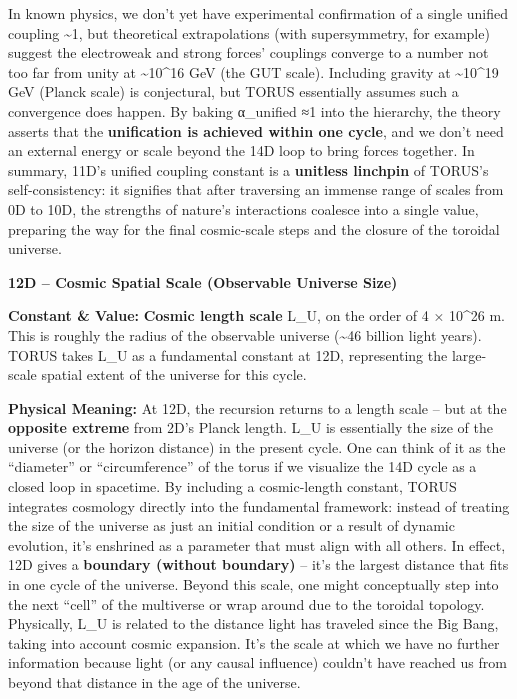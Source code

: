 \documentclass[
]{article}
\begin{document}
In known physics, we don't yet have experimental confirmation of a
single unified coupling \textasciitilde1, but theoretical extrapolations
(with supersymmetry, for example) suggest the electroweak and strong
forces' couplings converge to a number not too far from unity at
\textasciitilde10\^{}16 GeV (the GUT scale)\hspace{0pt}. Including
gravity at \textasciitilde10\^{}19 GeV (Planck scale) is conjectural,
but TORUS essentially assumes such a convergence does happen. By baking
α\_unified ≈1 into the hierarchy, the theory asserts that the
\textbf{unification is achieved within one cycle}, and we don't need an
external energy or scale beyond the 14D loop to bring forces together.
In summary, 11D's unified coupling constant is a \textbf{unitless
linchpin} of TORUS's self-consistency: it signifies that after
traversing an immense range of scales from 0D to 10D, the strengths of
nature's interactions coalesce into a single value, preparing the way
for the final cosmic-scale steps and the closure of the toroidal
universe.

\textbf{12D -- Cosmic Spatial Scale (Observable Universe Size)}

\textbf{Constant \& Value:} \textbf{Cosmic length scale} L\_U, on the
order of 4 × 10\^{}26 m\hspace{0pt}. This is roughly the radius of the
observable universe (\textasciitilde46 billion light years). TORUS takes
L\_U as a fundamental constant at 12D, representing the large-scale
spatial extent of the universe for this cycle.

\textbf{Physical Meaning:} At 12D, the recursion returns to a length
scale -- but at the \textbf{opposite extreme} from 2D's Planck length.
L\_U is essentially the size of the universe (or the horizon distance)
in the present cycle\hspace{0pt}. One can think of it as the
``diameter'' or ``circumference'' of the torus if we visualize the 14D
cycle as a closed loop in spacetime\hspace{0pt}. By including a
cosmic-length constant, TORUS integrates cosmology directly into the
fundamental framework: instead of treating the size of the universe as
just an initial condition or a result of dynamic evolution, it's
enshrined as a parameter that must align with all others. In effect, 12D
gives a \textbf{boundary (without boundary)} -- it's the largest
distance that fits in one cycle of the universe. Beyond this scale, one
might conceptually step into the next ``cell'' of the multiverse or wrap
around due to the toroidal topology. Physically, L\_U is related to the
distance light has traveled since the Big Bang, taking into account
cosmic expansion. It's the scale at which we have no further information
because light (or any causal influence) couldn't have reached us from
beyond that distance in the age of the universe.
\end{document}
